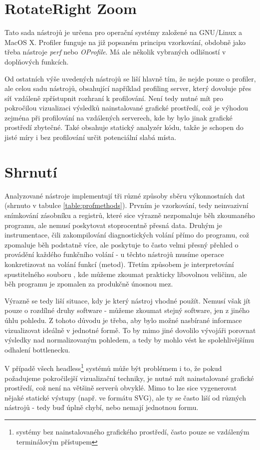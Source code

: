 \documentclass[czech,BP]{thesiskiv}
\begin{document}
\section{RotateRight Zoom}

Tato sada nástrojů je určena pro operační systémy založené na GNU/Linux a MacOS X. Profiler funguje na již popsaném principu vzorkování, obdobně jako třeba nástroje \emph{perf} nebo \emph{OProfile}. Má ale několik vybraných odlišností v doplňových funkcích.

Od ostatních výše uvedených nástrojů se liší hlavně tím, že nejde pouze o profiler, ale celou sadu nástrojů, obsahující například profiling server, který dovoluje přes síť vzdáleně zpřístupnit rozhraní k profilování. Není tedy nutné mít pro pokročilou vizualizaci výsledků nainstalované grafické prostředí, což je výhodou zejména při profilování na vzdálených serverech, kde by bylo jinak grafické prostředí zbytečné. Také obsahuje statický analyzér kódu, takže je schopen do jisté míry i bez profilování určit potenciální slabá místa.

\section{Shrnutí}

Analyzované nástroje implementují tři různé způsoby sběru výkonnostních dat (shrnuto v tabulce \ref{table:profmethods}). Prvním je vzorkování, tedy neinvazivní snímkování zásobníku a registrů, které sice výrazně nezpomaluje běh zkoumaného programu, ale nemusí poskytovat stoprocentně přesná data. Druhým je instrumentace, čili zakompilování diagnostických volání přímo do programu, což zpomaluje běh podstatně více, ale poskytuje to často velmi přesný přehled o provádění každého funkčního volání - u těchto nástrojů musíme operace konkretizovat na volání funkcí (metod). Třetím způsobem je interpretování spustitelného souboru , kde můžeme zkoumat prakticky libovolnou veličinu, ale běh programu je zpomalen za produkčně únosnou mez.

Výrazně se tedy liší situace, kdy je který nástroj vhodné použít. Nemusí však jít pouze o rozdílné druhy software - můžeme zkoumat stejný software, jen z jiného úhlu pohledu. Z tohoto důvodu je třeba, aby bylo možné nasbírané informace vizualizovat ideálně v jednotné formě. To by mimo jiné dovolilo vývojáři porovnat výsledky nad normalizovaným pohledem, a tedy by mohlo vést ke spolehlivějšímu odhalení bottlenecku.

V případě všech headless\footnote{systémy bez nainstalovaného grafického prostředí, často pouze se vzdáleným terminálovým přístupem} systémů může být problémem i to, že pokud požadujeme pokročilejší vizualizační techniky, je nutné mít nainstalované grafické prostředí, což není na většině serverů obvyklé. Mimo to lze sice vygenerovat nějaké statické výstupy (např. ve formátu SVG), ale ty se často liší od různých nástrojů - tedy buď úplně chybí, nebo nemají jednotnou formu.
\end{document}
